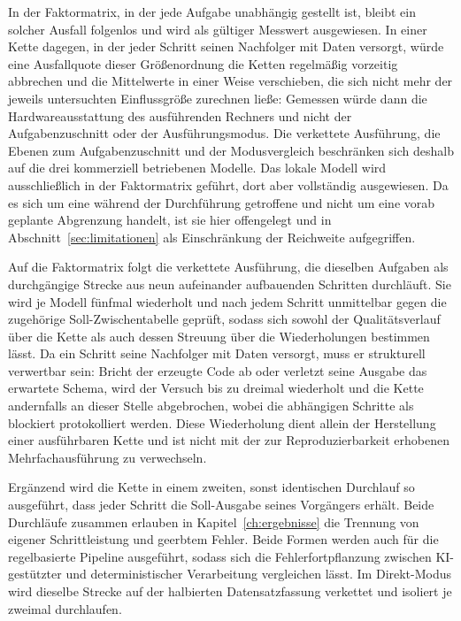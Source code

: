 In der Faktormatrix, in der jede Aufgabe unabhängig gestellt ist, bleibt ein solcher Ausfall folgenlos und wird als gültiger Messwert ausgewiesen. In einer Kette dagegen, in der jeder Schritt seinen Nachfolger mit Daten versorgt, würde eine Ausfallquote dieser Größenordnung die Ketten regelmäßig vorzeitig abbrechen und die Mittelwerte in einer Weise verschieben, die sich nicht mehr der jeweils untersuchten Einflussgröße zurechnen ließe: Gemessen würde dann die Hardwareausstattung des ausführenden Rechners und nicht der Aufgabenzuschnitt oder der Ausführungsmodus. Die verkettete Ausführung, die Ebenen zum Aufgabenzuschnitt und der Modusvergleich beschränken sich deshalb auf die drei kommerziell betriebenen Modelle. Das lokale Modell wird ausschließlich in der Faktormatrix geführt, dort aber vollständig ausgewiesen. Da es sich um eine während der Durchführung getroffene und nicht um eine vorab geplante Abgrenzung handelt, ist sie hier offengelegt und in Abschnitt~\ref{sec:limitationen} als Einschränkung der Reichweite aufgegriffen.

Auf die Faktormatrix folgt die verkettete Ausführung, die dieselben Aufgaben als durchgängige Strecke aus neun aufeinander aufbauenden Schritten durchläuft. Sie wird je Modell fünfmal wiederholt und nach jedem Schritt unmittelbar gegen die zugehörige Soll-Zwischentabelle geprüft, sodass sich sowohl der Qualitätsverlauf über die Kette als auch dessen Streuung über die Wiederholungen bestimmen lässt. Da ein Schritt seine Nachfolger mit Daten versorgt, muss er strukturell verwertbar sein: Bricht der erzeugte Code ab oder verletzt seine Ausgabe das erwartete Schema, wird der Versuch bis zu dreimal wiederholt und die Kette andernfalls an dieser Stelle abgebrochen, wobei die abhängigen Schritte als blockiert protokolliert werden. Diese Wiederholung dient allein der Herstellung einer ausführbaren Kette und ist nicht mit der zur Reproduzierbarkeit erhobenen Mehrfachausführung zu verwechseln.

Ergänzend wird die Kette in einem zweiten, sonst identischen Durchlauf so ausgeführt, dass jeder Schritt die Soll-Ausgabe seines Vorgängers erhält. Beide Durchläufe zusammen erlauben in Kapitel~\ref{ch:ergebnisse} die Trennung von eigener Schrittleistung und geerbtem Fehler. Beide Formen werden auch für die regelbasierte Pipeline ausgeführt, sodass sich die Fehlerfortpflanzung zwischen \ac{KI}-gestützter und deterministischer Verarbeitung vergleichen lässt. Im Direkt-Modus wird dieselbe Strecke auf der halbierten Datensatzfassung verkettet und isoliert je zweimal durchlaufen.


